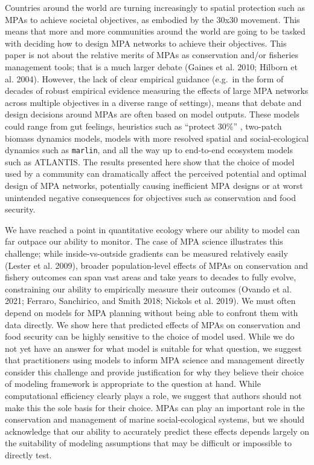 \documentclass[
  default,
  lineno,
  referee]{sn-jnl}
\begin{document}
Countries around the world are turning increasingly to spatial
protection such as MPAs to achieve societal objectives, as embodied by
the 30x30 movement. This means that more and more communities around the
world are going to be tasked with deciding how to design MPA networks to
achieve their objectives. This paper is not about the relative merits of
MPAs as conservation and/or fisheries management tools; that is a much
larger debate (Gaines et al. 2010; Hilborn et al. 2004). However, the
lack of clear empirical guidance (e.g.~in the form of decades of robust
empirical evidence measuring the effects of large MPA networks across
multiple objectives in a diverse range of settings), means that debate
and design decisions around MPAs are often based on model outputs. These
models could range from gut feelings, heuristics such as ``protect
30\%'' , two-patch biomass dynamics models, models with more resolved
spatial and social-ecological dynamics such as \texttt{marlin}, and all
the way up to end-to-end ecosystem models such as ATLANTIS. The results
presented here show that the choice of model used by a community can
dramatically affect the perceived potential and optimal design of MPA
networks, potentially causing inefficient MPA designs or at worst
unintended negative consequences for objectives such as conservation and
food security.

We have reached a point in quantitative ecology where our ability to
model can far outpace our ability to monitor. The case of MPA science
illustrates this challenge; while inside-vs-outside gradients can be
measured relatively easily (Lester et al. 2009), broader
population-level effects of MPAs on conservation and fishery outcomes
can span vast areas and take years to decades to fully evolve,
constraining our ability to empirically measure their outcomes (Ovando
et al. 2021; Ferraro, Sanchirico, and Smith 2018; Nickols et al. 2019).
We must often depend on models for MPA planning without being able to
confront them with data directly. We show here that predicted effects of
MPAs on conservation and food security can be highly sensitive to the
choice of model used. While we do not yet have an answer for what model
is suitable for what question, we suggest that practitioners using
models to inform MPA science and management directly consider this
challenge and provide justification for why they believe their choice of
modeling framework is appropriate to the question at hand. While
computational efficiency clearly plays a role, we suggest that authors
should not make this the sole basis for their choice. MPAs can play an
important role in the conservation and management of marine
social-ecological systems, but we should acknowledge that our ability to
accurately predict these effects depends largely on the suitability of
modeling assumptions that may be difficult or impossible to directly
test.
\end{document}
